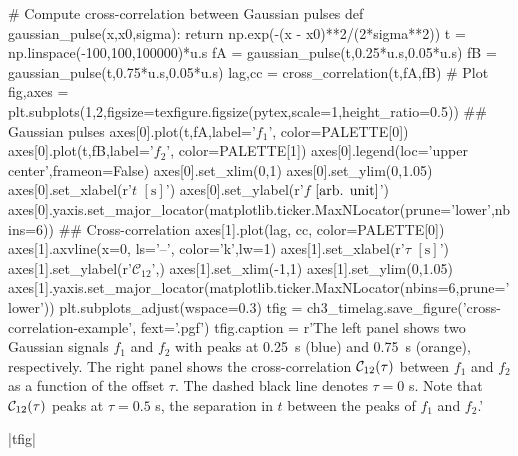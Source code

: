 \begin{pycode}
# Compute cross-correlation between Gaussian pulses
def gaussian_pulse(x,x0,sigma):
    return np.exp(-(x - x0)**2/(2*sigma**2))
t = np.linspace(-100,100,100000)*u.s
fA = gaussian_pulse(t,0.25*u.s,0.05*u.s)
fB = gaussian_pulse(t,0.75*u.s,0.05*u.s)
lag,cc = cross_correlation(t,fA,fB)
# Plot
fig,axes = plt.subplots(1,2,figsize=texfigure.figsize(pytex,scale=1,height_ratio=0.5))
## Gaussian pulses
axes[0].plot(t,fA,label='$f_1$', color=PALETTE[0])
axes[0].plot(t,fB,label='$f_2$', color=PALETTE[1])
axes[0].legend(loc='upper center',frameon=False)
axes[0].set_xlim(0,1)
axes[0].set_ylim(0,1.05)
axes[0].set_xlabel(r'$t$ $[\si{\second}]$')
axes[0].set_ylabel(r'$f$ $[\textup{arb. unit}]$')
axes[0].yaxis.set_major_locator(matplotlib.ticker.MaxNLocator(prune='lower',nbins=6))
## Cross-correlation
axes[1].plot(lag, cc, color=PALETTE[0])
axes[1].axvline(x=0, ls='--', color='k',lw=1)
axes[1].set_xlabel(r'$\tau$ $[\si{\second}]$')
axes[1].set_ylabel(r'$\mathcal{C}_{12}$',)
axes[1].set_xlim(-1,1)
axes[1].set_ylim(0,1.05)
axes[1].yaxis.set_major_locator(matplotlib.ticker.MaxNLocator(nbins=6,prune='lower'))
plt.subplots_adjust(wspace=0.3)
tfig = ch3_timelag.save_figure('cross-correlation-example', fext='.pgf')
tfig.caption = r'The left panel shows two Gaussian signals $f_1$ and $f_2$ with peaks at \SI{0.25}{\second} (blue) and \SI{0.75}{\second} (orange), respectively. The right panel shows the cross-correlation $\crosscor[12]$ between $f_1$ and $f_2$ as a function of the offset $\tau$. The dashed black line denotes $\tau=0$ \si{\second}. Note that $\crosscor[12]$ peaks at $\tau=0.5$ \si{\second}, the separation in $t$ between the peaks of $f_1$ and $f_2$.'
\end{pycode}
|tfig|

